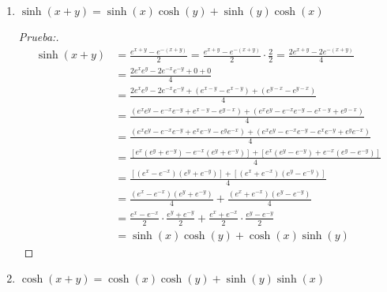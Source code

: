 \documentclass[12pt]{article}
\begin{document}
\begin{enumerate}[\hspace{9px} a)]
    \item \(\sinh(x+y)=\sinh(x)\cosh(y)+\sinh(y)\cosh(x)\)
    
    \begin{proof}[Prueba:]
        \begin{align*}
            \sinh(x+y) &= \frac{e^{x+y}-e^{-(x+y)}}{2} = \frac{e^{x+y}-e^{-(x+y)}}{2}\cdot\frac{2}{2} = \frac{2e^{x+y}-2e^{-(x+y)}}{4} \\
            &= \frac{2e^xe^y-2e^{-x}e^{-y}+0+0}{4}\\
            &= \frac{2e^xe^y-2e^{-x}e^{-y}+(e^{x-y}-e^{x-y})+(e^{y-x}-e^{y-x})}{4}\\
            &= \frac{(e^xe^y-e^{-x}e^{-y}+e^{x-y}-e^{y-x})+(e^xe^y-e^{-x}e^{-y}-e^{x-y}+e^{y-x})}{4}\\
            &= \frac{(e^xe^y-e^{-x}e^{-y}+e^xe^{-y}-e^ye^{-x})+(e^xe^y-e^{-x}e^{-y}-e^xe^{-y}+e^ye^{-x})}{4}\\
            &= \frac{[e^x(e^y+e^{-y})-e^{-x}(e^y+e^{-y})]+[e^x(e^y-e^{-y})+e^{-x}(e^y-e^{-y})]}{4}\\
            &= \frac{[(e^x-e^{-x})(e^y+e^{-y})]+[(e^x+e^{-x})(e^y-e^{-y})]}{4}\\
            &= \frac{(e^x-e^{-x})(e^y+e^{-y})}{4}+\frac{(e^x+e^{-x})(e^y-e^{-y})}{4}\\
            &= \frac{e^x-e^{-x}}{2}\cdot\frac{e^y+e^{-y}}{2}+\frac{e^x+e^{-x}}{2}\cdot\frac{e^y-e^{-y}}{2}\\
            &= \sinh(x)\cosh(y)+\cosh(x)\sinh(y)
        \end{align*}
    \end{proof}

    \item \(\cosh(x+y)=\cosh(x)\cosh(y)+\sinh(y)\sinh(x)\)
    

\end{enumerate}
\end{document}
